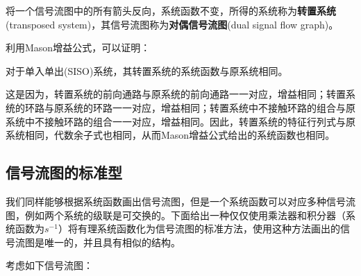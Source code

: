 \begin{definition}[转置系统]
    将一个信号流图中的所有箭头反向，系统函数不变，所得的系统称为\textbf{转置系统}(transposed system)，其信号流图称为\textbf{对偶信号流图}(dual signal flow graph)。
\end{definition}
利用Mason增益公式，可以证明：
\begin{theorem}
    对于单入单出(SISO)系统，其转置系统的系统函数与原系统相同。
\end{theorem}
这是因为，转置系统的前向通路与原系统的前向通路一一对应，增益相同；转置系统的环路与原系统的环路一一对应，增益相同；转置系统中不接触环路的组合与原系统中不接触环路的组合一一对应，增益相同。因此，转置系统的特征行列式与原系统相同，代数余子式也相同，从而Mason增益公式给出的系统函数也相同。

\subsection{信号流图的标准型}\label{sub:standard_form}

我们同样能够根据系统函数画出信号流图，但是一个系统函数可以对应多种信号流图，例如两个系统的级联是可交换的。下面给出一种仅仅使用乘法器和积分器（系统函数为$s^{-1}$）将有理系统函数化为信号流图的标准方法，使用这种方法画出的信号流图是唯一的，并且具有相似的结构。

考虑如下信号流图：

